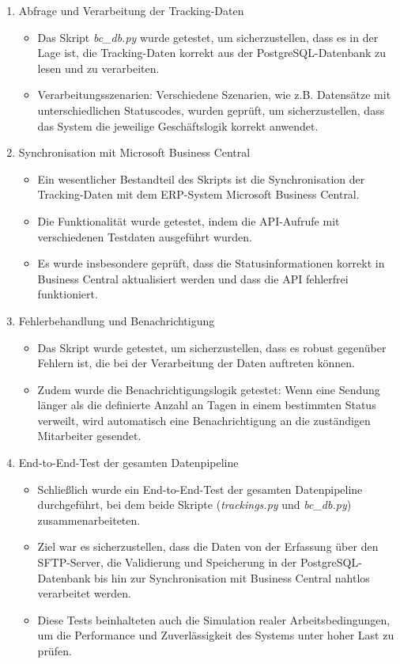 \begin{enumerate}
    \item Abfrage und Verarbeitung der Tracking-Daten
    \begin{itemize}
        \item Das Skript \textit{bc\_db.py} wurde getestet, um sicherzustellen, dass es in der Lage ist, die Tracking-Daten korrekt aus der PostgreSQL-Datenbank zu lesen und zu verarbeiten.
        \item Verarbeitungsszenarien: Verschiedene Szenarien, wie z.B. Datensätze mit unterschiedlichen Statuscodes, wurden geprüft, um sicherzustellen, dass das System die jeweilige Geschäftslogik korrekt anwendet.
    \end{itemize}
    \item Synchronisation mit Microsoft Business Central
    \begin{itemize}
        \item Ein wesentlicher Bestandteil des Skripts ist die Synchronisation der Tracking-Daten mit dem ERP-System Microsoft Business Central.
        \item Die Funktionalität wurde getestet, indem die API-Aufrufe mit verschiedenen Testdaten ausgeführt wurden.
        \item Es wurde insbesondere geprüft, dass die Statusinformationen korrekt in Business Central aktualisiert werden und dass die API fehlerfrei funktioniert.
    \end{itemize}
    \item Fehlerbehandlung und Benachrichtigung
    \begin{itemize}
        \item Das Skript wurde getestet, um sicherzustellen, dass es robust gegenüber Fehlern ist, die bei der Verarbeitung der Daten auftreten können.
        \item Zudem wurde die Benachrichtigungslogik getestet: Wenn eine Sendung länger als die definierte Anzahl an Tagen in einem bestimmten Status verweilt, wird automatisch eine Benachrichtigung an die zuständigen Mitarbeiter gesendet.
    \end{itemize}
    \item End-to-End-Test der gesamten Datenpipeline
    \begin{itemize}
        \item Schließlich wurde ein End-to-End-Test der gesamten Datenpipeline durchgeführt, bei dem beide Skripte (\textit{trackings.py} und \textit{bc\_db.py}) zusammenarbeiteten.
        \item Ziel war es sicherzustellen, dass die Daten von der Erfassung über den SFTP-Server, die Validierung und Speicherung in der PostgreSQL-Datenbank bis hin zur Synchronisation mit Business Central nahtlos verarbeitet werden.
        \item Diese Tests beinhalteten auch die Simulation realer Arbeitsbedingungen, um die Performance und Zuverlässigkeit des Systems unter hoher Last zu prüfen.
    \end{itemize}
\end{enumerate}
